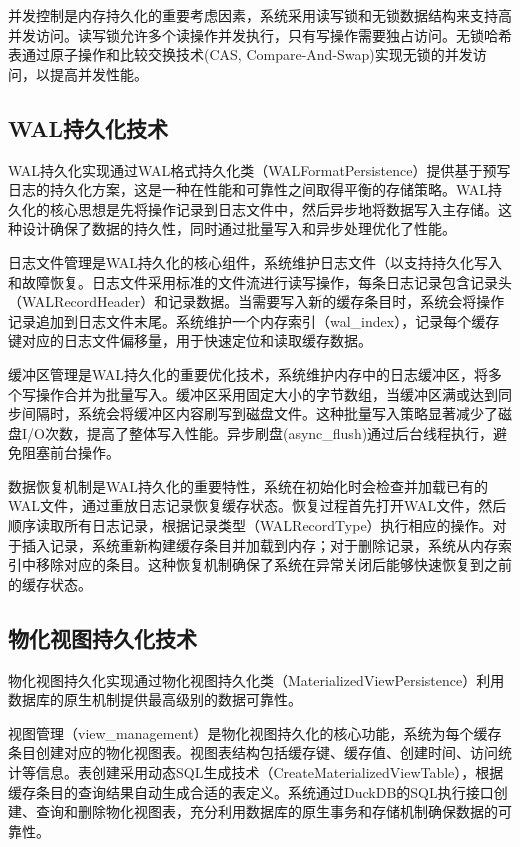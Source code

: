并发控制是内存持久化的重要考虑因素，系统采用读写锁和无锁数据结构来支持高并发访问。读写锁允许多个读操作并发执行，只有写操作需要独占访问。无锁哈希表通过原子操作和比较交换技术(CAS, Compare-And-Swap)实现无锁的并发访问，以提高并发性能。

\subsection{WAL持久化技术}

WAL持久化实现通过WAL格式持久化类（WALFormatPersistence）提供基于预写日志的持久化方案，这是一种在性能和可靠性之间取得平衡的存储策略。WAL持久化的核心思想是先将操作记录到日志文件中，然后异步地将数据写入主存储。这种设计确保了数据的持久性，同时通过批量写入和异步处理优化了性能。

日志文件管理是WAL持久化的核心组件，系统维护日志文件（以支持持久化写入和故障恢复。日志文件采用标准的文件流进行读写操作，每条日志记录包含记录头（WALRecordHeader）和记录数据。当需要写入新的缓存条目时，系统会将操作记录追加到日志文件末尾。系统维护一个内存索引（wal\_index），记录每个缓存键对应的日志文件偏移量，用于快速定位和读取缓存数据。

缓冲区管理是WAL持久化的重要优化技术，系统维护内存中的日志缓冲区，将多个写操作合并为批量写入。缓冲区采用固定大小的字节数组，当缓冲区满或达到同步间隔时，系统会将缓冲区内容刷写到磁盘文件。这种批量写入策略显著减少了磁盘I/O次数，提高了整体写入性能。异步刷盘(async\_flush)通过后台线程执行，避免阻塞前台操作。

数据恢复机制是WAL持久化的重要特性，系统在初始化时会检查并加载已有的WAL文件，通过重放日志记录恢复缓存状态。恢复过程首先打开WAL文件，然后顺序读取所有日志记录，根据记录类型（WALRecordType）执行相应的操作。对于插入记录，系统重新构建缓存条目并加载到内存；对于删除记录，系统从内存索引中移除对应的条目。这种恢复机制确保了系统在异常关闭后能够快速恢复到之前的缓存状态。

\subsection{物化视图持久化技术}

物化视图持久化实现通过物化视图持久化类（MaterializedViewPersistence）利用数据库的原生机制提供最高级别的数据可靠性。

视图管理（view\_management）是物化视图持久化的核心功能，系统为每个缓存条目创建对应的物化视图表。视图表结构包括缓存键、缓存值、创建时间、访问统计等信息。表创建采用动态SQL生成技术（CreateMaterializedViewTable），根据缓存条目的查询结果自动生成合适的表定义。系统通过DuckDB的SQL执行接口创建、查询和删除物化视图表，充分利用数据库的原生事务和存储机制确保数据的可靠性。

